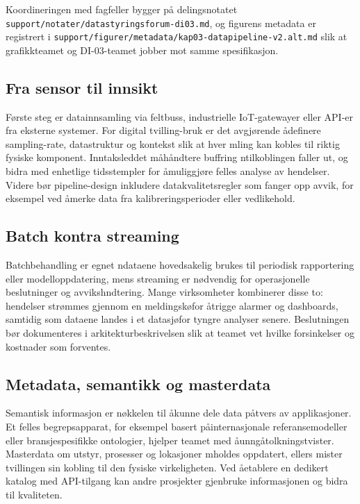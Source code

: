 Koordineringen med fagfeller bygger på delingsnotatet \texttt{support/notater/datastyringsforum-di03.md}, og figurens metadata er registrert i \texttt{support/figurer/metadata/kap03-datapipeline-v2.alt.md} slik at grafikkteamet og DI-03-teamet jobber mot samme spesifikasjon.

\subsection{Fra sensor til innsikt}
F\o rste steg er datainnsamling via feltbuss, industrielle IoT-gatewayer eller API-er fra eksterne systemer. For digital tvilling-bruk er det avgj\o rende \aa definere sampling-rate, datastruktur og kontekst slik at hver m\a ling kan kobles til riktig fysiske komponent. Inntaksleddet m\aa h\aa ndtere buffring n\aar tilkoblingen faller ut, og bidra med enhetlige tidsstempler for \aa muliggj\o re felles analyse av hendelser. Videre b\o r pipeline-design inkludere datakvalitetsregler som fanger opp avvik, for eksempel ved \aa merke data fra kalibreringsperioder eller vedlikehold.

\subsection{Batch kontra streaming}
Batchbehandling er egnet n\aar dataene hovedsakelig brukes til periodisk rapportering eller modelloppdatering, mens streaming er n\o dvendig for operasjonelle beslutninger og avviksh\a ndtering. Mange virksomheter kombinerer disse to: hendelser str\o mmes gjennom en meldingsk\o for \aa trigge alarmer og dashboards, samtidig som dataene landes i et datasj\o for tyngre analyser senere. Beslutningen b\o r dokumenteres i arkitekturbeskrivelsen slik at teamet vet hvilke forsinkelser og kostnader som forventes.

\subsection{Metadata, semantikk og masterdata}
Semantisk informasjon er n\o kkelen til \aa kunne dele data p\aa tvers av applikasjoner. Et felles begrepsapparat, for eksempel basert p\aa internasjonale referansemodeller eller bransjespesifikke ontologier, hjelper teamet med \aa unng\aa tolkningstvister. Masterdata om utstyr, prosesser og lokasjoner m\a holdes oppdatert, ellers mister tvillingen sin kobling til den fysiske virkeligheten. Ved \aa etablere en dedikert katalog med API-tilgang kan andre prosjekter gjenbruke informasjonen og bidra til kvaliteten.

